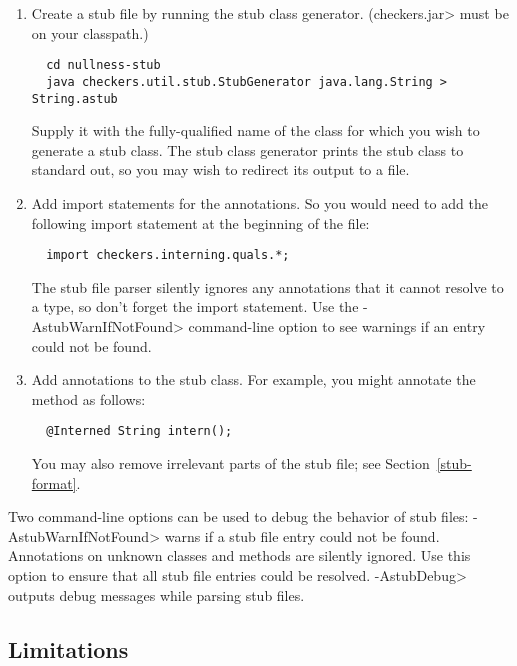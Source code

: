 \begin{enumerate}

\item
  Create a stub file by running the stub class generator.  (\<checkers.jar>
  must be on your classpath.)

\begin{Verbatim}
  cd nullness-stub
  java checkers.util.stub.StubGenerator java.lang.String > String.astub
\end{Verbatim}

  Supply it with the fully-qualified name of the class for which you wish to
  generate a stub class.  The stub class generator prints the
  stub class to standard out, so you may wish to redirect its output to a
  file.

\item
  Add import statements for the annotations.  So you would need to
add the following import statement at the beginning of the file:

\begin{Verbatim}
  import checkers.interning.quals.*;
\end{Verbatim}

\noindent
The stub file parser silently ignores any annotations that it cannot
resolve to a type, so don't forget the import statement.
Use the \<-AstubWarnIfNotFound> command-line option to see warnings
if an entry could not be found.

\item
  Add annotations to the stub class.  For example, you might annotate
  the  method as follows:

\begin{Verbatim}
  @Interned String intern();
\end{Verbatim}

  You may also remove irrelevant parts of the stub file; see
  Section~\ref{stub-format}.

\end{enumerate}


Two command-line options can be used to debug the behavior of stub
files:
\<-AstubWarnIfNotFound> warns if a stub file entry could not be
found. Annotations on unknown classes and methods are silently
ignored. Use this option to ensure that all stub file entries could be
resolved.
\<-AstubDebug> outputs debug messages while parsing stub files.


\subsection{Limitations\label{stub-limitations}}

